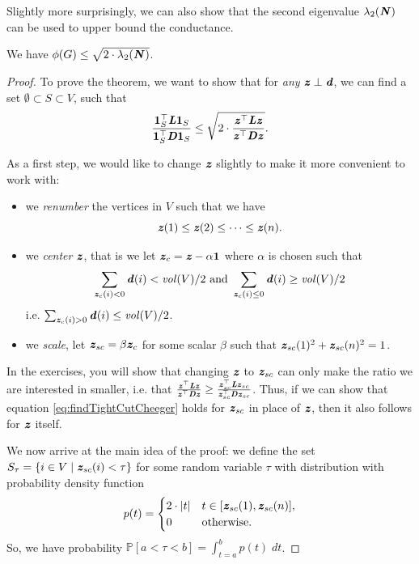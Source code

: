 Slightly more surprisingly, we can also show that the second eigenvalue $\lambda_2(\boldsymbol{\mathit{N}})$ can be used to upper bound the conductance.

\begin{theorem}\label{thm:cheegerInequUpperBound}
We have $\phi(G) \leq \sqrt{2 \cdot \lambda_2(\boldsymbol{\mathit{N}})}$.
\end{theorem}
\begin{proof}
To prove the theorem, we want to show that for \emph{any} $\boldsymbol{\mathit{z}} \perp \boldsymbol{\mathit{d}}$, we can find a set $\emptyset \subset S \subset V$, such that 
\begin{equation}\label{eq:findTightCutCheeger}
\frac{\boldsymbol{1}_S^\top \boldsymbol{\mathit{L}} \boldsymbol{1}_S}{\boldsymbol{1}_S^\top \boldsymbol{\mathit{D}} \boldsymbol{1}_S}  \leq \sqrt{2 \cdot \frac{\boldsymbol{\mathit{z}}^\top \boldsymbol{\mathit{L}} \boldsymbol{\mathit{z}}}{\boldsymbol{\mathit{z}}^\top \boldsymbol{\mathit{D}} \boldsymbol{\mathit{z}}}}.    
\end{equation}

As a first step, we would like to change $\boldsymbol{\mathit{z}}$ slightly to make it more convenient to work with:
\begin{itemize}
    \item we \emph{renumber} the vertices in $V$ such that we have
    \[
    \boldsymbol{\mathit{z}}(1) \leq \boldsymbol{\mathit{z}}(2) \leq \dots \leq \boldsymbol{\mathit{z}}(n).
    \]
    \item we \emph{center} $\boldsymbol{\mathit{z}}$, that is we let $\boldsymbol{\mathit{z}}_c = \boldsymbol{\mathit{z}} - \alpha \boldsymbol{1}$ where $\alpha$ is chosen such that \begin{align*}
        \sum_{\boldsymbol{\mathit{z}}_c(i) < 0} \boldsymbol{\mathit{d}}(i) < \mathit{vol}(V)/2 \text{ and }
        \sum_{\boldsymbol{\mathit{z}}_c(i) \leq 0} \boldsymbol{\mathit{d}}(i) \geq \mathit{vol}(V)/2
    \end{align*}
    i.e. $\sum_{\boldsymbol{\mathit{z}}_c(i) > 0} \boldsymbol{\mathit{d}}(i) \leq \mathit{vol}(V)/2$.
    \item we \emph{scale}, let $\boldsymbol{\mathit{z}}_{sc} = \beta \boldsymbol{\mathit{z}}_c$ for some scalar $\beta$ such that $\boldsymbol{\mathit{z}}_{sc}(1)^2 + \boldsymbol{\mathit{z}}_{sc}(n)^2 = 1$. 
\end{itemize}
In the exercises, you will show that changing $\boldsymbol{\mathit{z}}$ to $\boldsymbol{\mathit{z}}_{sc}$ can only make the ratio we are interested in smaller, i.e. that
$\frac{\boldsymbol{\mathit{z}}^\top \boldsymbol{\mathit{L}} \boldsymbol{\mathit{z}}}{\boldsymbol{\mathit{z}}^\top \boldsymbol{\mathit{D}} \boldsymbol{\mathit{z}}} \geq \frac{\boldsymbol{\mathit{z}}_{sc}^\top \boldsymbol{\mathit{L}} \boldsymbol{\mathit{z}}_{sc}}{\boldsymbol{\mathit{z}}_{sc}^\top \boldsymbol{\mathit{D}} \boldsymbol{\mathit{z}}_{sc}}$. Thus, if we can show that equation \ref{eq:findTightCutCheeger} holds for $\boldsymbol{\mathit{z}}_{sc}$ in place of $\boldsymbol{\mathit{z}}$, then it also follows for $\boldsymbol{\mathit{z}}$ itself.

We now arrive at the main idea of the proof: we define the set $S_{\tau} = \{ i \in V \;|\; \boldsymbol{\mathit{z}}_{sc}(i) < \tau\}$ for some random variable $\tau$ with distribution with probability density function
\begin{align}\label{eq:cheegerDefineDensityFun}
    p(t) = \begin{cases}
        2 \cdot |t| &t \in [\boldsymbol{\mathit{z}}_{sc}(1), \boldsymbol{\mathit{z}}_{sc}(n)],
        \\
        0 &\text{otherwise}.
        \end{cases}
\end{align}
So, we have probability $\mathbb{P}[a < \tau < b] = \int_{t=a}^b p(t)\; dt$.


\end{proof}
